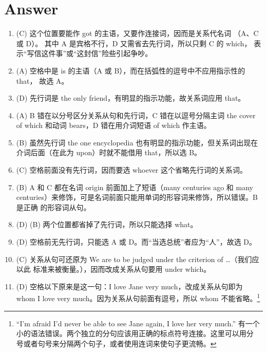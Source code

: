 \section{Answer}
\begin{enumerate}
\item (C) 这个位置要能作 got 的主语，又要作连接词，因而是关系代名词
  （A、C 或 D）。 其中 A 是宾格不行，D 又需省去先行词，所以只剩 C 的 which，
  表示“写信这件事”或“这封信”险些引起争吵。


\item (A) 空格中是 is 的主语（A 或 B），而在括弧性的逗号中不应用指示性的 that，
  故选 A。

\item (D) 先行词是 the only friend，有明显的指示功能，故关系词应用 that。

\item (A) B 错在以分号区分关系从句和先行词，C 错在以逗号分隔主词 the cover of which 和动词 bears，D 错在用介词短语 of which 作主语。


\item  (B) 虽然先行词 the one encyclopedia 也有明显的指示功能，但关系词出现在介词后面（在此为 upon）时就不能借用 that，所以选 B。

\item (C) 空格前面没有先行词，因而要选 whoever 这个省略先行词的关系词。

\item (B) A 和 C 都在名词 origin 前面加上了短语（many centuries ago 和 many
  centuries）来修饰，可是名词前面只能用单词的形容词来修饰，所以错误。B 是正确
  的形容词从句。

\item {} (D)  (B) 两个位置都省掉了先行词，所以只能选择 what。
\item (D) 空格前无先行词，只能选 A 或 D。而“当选总统”者应为“人”，故选 D。


\item (C) 关系从句可还原为 We are to be judged under the criterion of \ldots（我们应以此
  标准来被衡量。），因而改成关系从句要用 under which。


\item (D) 空格以下原来是这一句：I love Jane very much，改成关系从句即为 whom I
  love very much。因为关系从句前面有逗号，所以 whom 不能省略。\footnote{
    “I'm afraid I'd never be able to see Jane again, I love her very much.”
    有一个小的语法错误。两个独立的分句应该用正确的标点符号连接。这里可以用分
    号或者句号来分隔两个句子，或者使用连词来使句子更流畅。

}
\end{enumerate}
